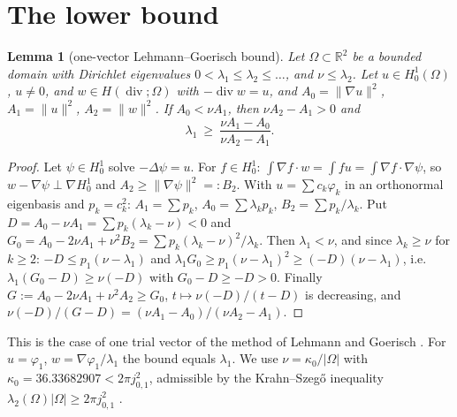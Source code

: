 \documentclass[11pt]{article}
\newtheorem{lemma}[theorem]{Lemma}
\theoremstyle{remark}
\newcommand{\R}{\mathbb{R}}
\DeclareMathOperator{\dv}{div}
\begin{document}
\section{The lower bound}
\begin{lemma}[one-vector Lehmann--Goerisch bound]\label{lem:LG}
Let $\Omega\subset\R^2$ be a bounded domain with Dirichlet eigenvalues $0<\lambda_1\le\lambda_2\le\dots$, and
$\nu\le\lambda_2$. Let $u\in H^1_0(\Omega)$, $u\ne0$, and $w\in H(\dv;\Omega)$ with $-\dv w=u$, and
$A_0=\|\nabla u\|^2$, $A_1=\|u\|^2$, $A_2=\|w\|^2$. If $A_0<\nu A_1$, then $\nu A_2-A_1>0$ and
\[
\lambda_1\ \ge\ \frac{\nu A_1-A_0}{\nu A_2-A_1}.
\]
\end{lemma}
\begin{proof}
Let $\psi\in H^1_0$ solve $-\Delta\psi=u$. For $f\in H^1_0$: $\int\nabla f\cdot w=\int fu=\int\nabla f\cdot\nabla\psi$,
so $w-\nabla\psi\perp\nabla H^1_0$ and $A_2\ge\|\nabla\psi\|^2=:B_2$. With $u=\sum c_k\varphi_k$ in an orthonormal
eigenbasis and $p_k=c_k^2$: $A_1=\sum p_k$, $A_0=\sum\lambda_kp_k$, $B_2=\sum p_k/\lambda_k$. Put $D=A_0-\nu A_1=
\sum p_k(\lambda_k-\nu)<0$ and $G_0=A_0-2\nu A_1+\nu^2B_2=\sum p_k(\lambda_k-\nu)^2/\lambda_k$. Then $\lambda_1<\nu$, and
since $\lambda_k\ge\nu$ for $k\ge2$: $-D\le p_1(\nu-\lambda_1)$ and $\lambda_1G_0\ge p_1(\nu-\lambda_1)^2\ge
(-D)(\nu-\lambda_1)$, i.e.\ $\lambda_1(G_0-D)\ge\nu(-D)$ with $G_0-D\ge-D>0$. Finally $G:=A_0-2\nu A_1+\nu^2A_2\ge G_0$,
$t\mapsto\nu(-D)/(t-D)$ is decreasing, and $\nu(-D)/(G-D)=(\nu A_1-A_0)/(\nu A_2-A_1)$.
\end{proof}
This is the case of one trial vector of the method of Lehmann and Goerisch \cite{lehmann,gh,bg}. For $u=\varphi_1$,
$w=\nabla\varphi_1/\lambda_1$ the bound equals $\lambda_1$. We use $\nu=\kappa_0/|\Omega|$ with
$\kappa_0=36.33682907<2\pi j_{0,1}^2$, admissible by the Krahn--Szeg\H{o} inequality
$\lambda_2(\Omega)|\Omega|\ge2\pi j_{0,1}^2$ \cite{krahn,hong}.
\end{document}
